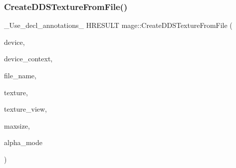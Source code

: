\hypertarget{namespacemage_a6385bd66f00f588eb7735234edd95f1e}{}\label{namespacemage_a6385bd66f00f588eb7735234edd95f1e} 
\subsubsection{\texorpdfstring{Create\+D\+D\+S\+Texture\+From\+File()}{CreateDDSTextureFromFile()}\hspace{0.1cm}{\footnotesize\ttfamily [4/4]}}
{\footnotesize\ttfamily \+\_\+\+Use\+\_\+decl\+\_\+annotations\+\_\+ H\+R\+E\+S\+U\+LT mage\+::\+Create\+D\+D\+S\+Texture\+From\+File (\begin{DoxyParamCaption}\item[{I\+D3\+D11\+Device2 $\ast$}]{device,  }\item[{I\+D3\+D11\+Device\+Context $\ast$}]{device\+\_\+context,  }\item[{const wchar\+\_\+t $\ast$}]{file\+\_\+name,  }\item[{I\+D3\+D11\+Resource $\ast$$\ast$}]{texture,  }\item[{I\+D3\+D11\+Shader\+Resource\+View $\ast$$\ast$}]{texture\+\_\+view,  }\item[{size\+\_\+t}]{maxsize,  }\item[{\hyperlink{namespacemage_a0c586a2bad862f4858900ca121ca80c2}{D\+D\+S\+\_\+\+A\+L\+P\+H\+A\+\_\+\+M\+O\+DE} $\ast$}]{alpha\+\_\+mode }\end{DoxyParamCaption})}

\hypertarget{namespacemage_ae578f902db78efb1e9466399d72fbdbd}{}\label{namespacemage_ae578f902db78efb1e9466399d72fbdbd} 
